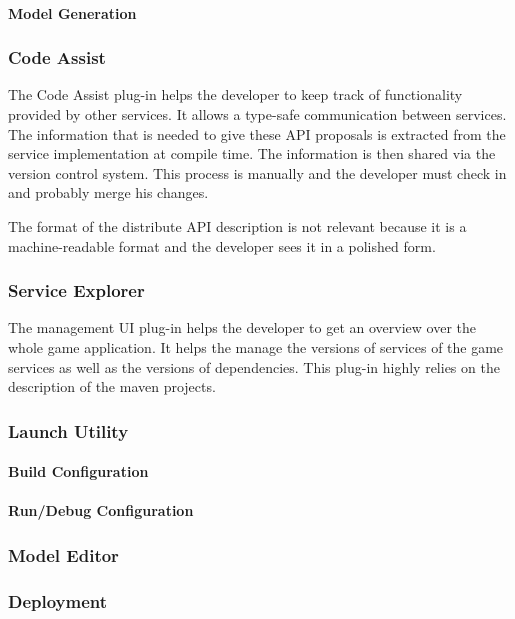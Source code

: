 \paragraph{Model Generation}

\subsubsection{Code Assist}

The Code Assist plug-in helps the developer to keep track of functionality
provided by other services. It allows a type-safe communication between
services. The information that is needed to give these API proposals is
extracted from the service implementation at compile time. The information is
then shared via the version control system. This process is manually and the
developer must check in and probably merge his changes. 

The format of the distribute API description is not relevant because it is a
machine-readable format and the developer sees it in a polished form.

\subsubsection{Service Explorer}

The management UI plug-in helps the developer to get an overview over the whole
game application. It helps the manage the versions of services of the game
services as well as the versions of dependencies. This plug-in highly relies on
the description of the maven projects.

\subsubsection{Launch Utility}

\paragraph{Build Configuration}

\paragraph{Run/Debug Configuration}

\subsubsection{Model Editor}

\subsubsection{Deployment}